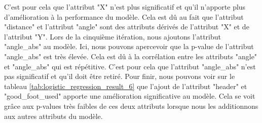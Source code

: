 \documentclass[12pt]{article}
\begin{document}
C'est pour cela que l'attribut "X" n'est plus significatif et qu'il n'apporte plus d'amélioration à la performance du modèle.
Cela est dû au fait que l'attribut "distance" et l'attribut "angle" sont des attributs dérivés de l'attribut "X" et de l'attribut "Y".
\newline\newline
Lors de la cinquième itération, nous ajoutons l'attribut "angle\_abs" au modèle.
Ici, nous pouvons apercevoir que la p-value de l'attribut "angle\_abs" est très élevée.
Cela est dû à la corrélation entre les attributs "angle" et "angle\_abs" qui est répétitive.
C'est pour cela que l'attribut "angle\_abs" n'est pas significatif et qu'il doit être retiré.
\newline\newline
Pour finir, nous pouvons voir sur le tableau \ref{tab:logistic_regression_result_6} que l'ajout de l'attribut "header" et "good\_foot\_used" apporte une amélioration significative au modèle.
Cela se voit grâce aux p-values très faibles de ces deux attributs lorsque nous les additionnons aux autres attributs du modèle.
\end{document}
